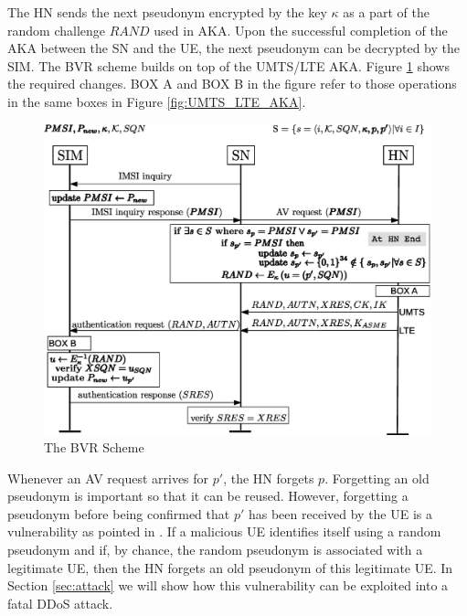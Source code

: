 \documentclass{llncs} %
\begin{document}
The HN sends the next pseudonym encrypted by the key $\kappa$ as a part of the random challenge $RAND$ used in AKA. Upon the successful completion of the AKA between the SN and the UE, the next pseudonym can be decrypted by the SIM. The BVR scheme builds on top of the UMTS/LTE AKA. Figure \ref{fig:bvr_solution} shows the required changes. BOX A and BOX B in the figure refer to those operations in the same boxes in Figure \ref{fig:UMTS_LTE_AKA}.


\begin{figure}[]
  \centering
    \includegraphics[scale = .4,clip = true,trim = .1cm 0cm 0cm 0cm]{BVR.eps}
  \caption{The BVR Scheme}
  \label{fig:bvr_solution}	
\end{figure}

Whenever an AV request arrives for $p'$, the HN forgets $p$. Forgetting an old pseudonym is important so that it can be reused. However, forgetting a pseudonym before being confirmed that $p'$ has been received by the UE is a vulnerability as pointed in \cite{wisec17}. If a malicious UE identifies itself using a random pseudonym and if, by chance, the random pseudonym is associated with a legitimate UE, then the HN forgets an old pseudonym of this legitimate UE. In Section \ref{sec:attack} we will show how this vulnerability can be exploited into a fatal DDoS attack.
\end{document}
